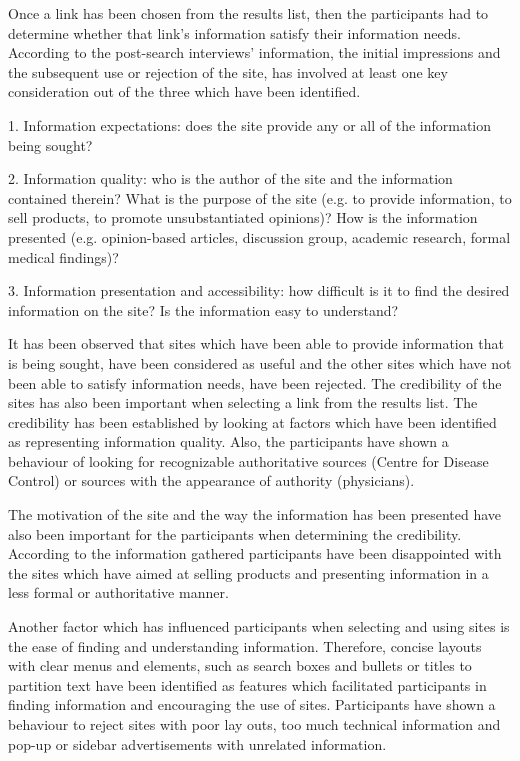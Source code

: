 \documentclass[]{article}
\begin{document}
Once a link has been chosen from the results list, then the participants had to determine whether that link’s information satisfy their information needs. According to the post-search interviews’ information, the initial impressions and the subsequent use or rejection of the site, has involved at least one key consideration out of the three which have been identified.     

1. Information expectations: does the site provide any or all of the information being sought? 

2. Information quality: who is the author of the site and the information contained therein? What is the purpose of the site (e.g. to provide information, to sell products, to promote unsubstantiated opinions)? How is the information presented (e.g. opinion-based articles, discussion group, academic research, formal medical findings)? 

3. Information presentation and accessibility: how difficult is it to find the desired information on the site? Is the information easy to understand? 

It has been observed that sites which have been able to provide information that is being sought, have been considered as useful and the other sites which have not been able to satisfy information needs, have been rejected. The credibility of the sites has also been important when selecting a link from the results list. The credibility has been established by looking at factors which have been identified as representing information quality. Also, the participants have shown a behaviour of looking for recognizable authoritative sources (Centre for Disease Control) or sources with the appearance of authority (physicians).      

The motivation of the site and the way the information has been presented have also been important for the participants when determining the credibility. According to the information gathered participants have been disappointed with the sites which have aimed at selling products and presenting information in a less formal or authoritative manner.  

Another factor which has influenced participants when selecting and using sites is the ease of  finding and understanding information. Therefore, concise layouts with clear menus and elements, such as search boxes and bullets or titles to partition text have been identified as features which facilitated participants in finding information and encouraging the use of sites. Participants have shown a behaviour to reject sites with poor lay outs, too much technical information and pop-up or sidebar advertisements with unrelated information.  
              
\end{document}
